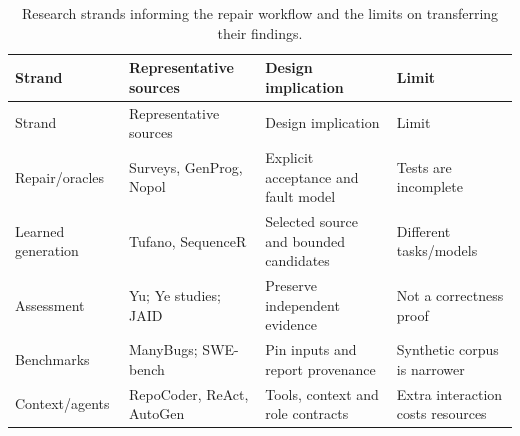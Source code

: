 \begin{longtable}[]{@{}
  >{\raggedright\arraybackslash}p{}
  >{\raggedright\arraybackslash}p{}
  >{\raggedright\arraybackslash}p{}
  >{\raggedright\arraybackslash}p{}@{}}
\caption[Research findings and design implications]{Research strands informing the repair workflow and the limits on transferring their findings.}\label{tab:2-1}\tabularnewline
\toprule\noalign{}
\begin{minipage}[b]{\linewidth}\raggedright
Strand
\end{minipage} & \begin{minipage}[b]{\linewidth}\raggedright
Representative sources
\end{minipage} & \begin{minipage}[b]{\linewidth}\raggedright
Design implication
\end{minipage} & \begin{minipage}[b]{\linewidth}\raggedright
Limit
\end{minipage} \\
\midrule\noalign{}
\endfirsthead
\toprule\noalign{}
\begin{minipage}[b]{\linewidth}\raggedright
Strand
\end{minipage} & \begin{minipage}[b]{\linewidth}\raggedright
Representative sources
\end{minipage} & \begin{minipage}[b]{\linewidth}\raggedright
Design implication
\end{minipage} & \begin{minipage}[b]{\linewidth}\raggedright
Limit
\end{minipage} \\
\midrule\noalign{}
\endhead
\bottomrule\noalign{}
\endlastfoot
Repair/oracles & Surveys, GenProg, Nopol & Explicit acceptance and fault model & Tests are incomplete \\
Learned generation & Tufano, SequenceR & Selected source and bounded candidates & Different tasks/models \\
Assessment & Yu; Ye studies; JAID & Preserve independent evidence & Not a correctness proof \\
Benchmarks & ManyBugs; SWE-bench & Pin inputs and report provenance & Synthetic corpus is narrower \\
Context/agents & RepoCoder, ReAct, AutoGen & Tools, context and role contracts & Extra interaction costs resources \\
\end{longtable}

